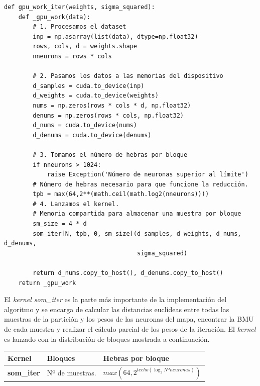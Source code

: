 \begin{code}
\begin{verbatim}
def gpu_work_iter(weights, sigma_squared):
    def _gpu_work(data):
        # 1. Procesamos el dataset
        inp = np.asarray(list(data), dtype=np.float32)
        rows, cols, d = weights.shape
        nneurons = rows * cols
        
        # 2. Pasamos los datos a las memorias del dispositivo
        d_samples = cuda.to_device(inp)
        d_weights = cuda.to_device(weights)
        nums = np.zeros(rows * cols * d, np.float32)
        denums = np.zeros(rows * cols, np.float32)
        d_nums = cuda.to_device(nums)
        d_denums = cuda.to_device(denums)
        
        # 3. Tomamos el número de hebras por bloque
        if nneurons > 1024:
            raise Exception('Número de neuronas superior al límite')
        # Número de hebras necesario para que funcione la reducción.
        tpb = max(64,2**(math.ceil(math.log2(nneurons))))
        # 4. Lanzamos el kernel.
        # Memoria compartida para almacenar una muestra por bloque
        sm_size = 4 * d
        som_iter[N, tpb, 0, sm_size](d_samples, d_weights, d_nums, d_denums,
                                     sigma_squared)
        
        return d_nums.copy_to_host(), d_denums.copy_to_host()
    return _gpu_work
\end{verbatim}
\label{code:somencapsulado}
\end{code}

El \textit{kernel som\_iter} es la parte más importante de la implementación del algoritmo y se encarga de calcular las distancias euclídeas entre todas las muestras de la partición y los pesos de las neuronas del mapa, encontrar la BMU de cada muestra y realizar el cálculo parcial de los pesos de la iteración. El \textit{kernel} es lanzado con la distribución de bloques mostrada a continuación.

\begin{table}[ht]
\begin{tabular}{@{}lll@{}}
\toprule
\textbf{Kernel}        & \textbf{Bloques}                                 & \textbf{Hebras por bloque}                                                                       \\ \midrule
\textbf{som\_iter} &   Nº de muestras. & $max(64,2^{techo(\log_2{Nº neuronas})})$ \\ \bottomrule
\end{tabular}
\end{table}


